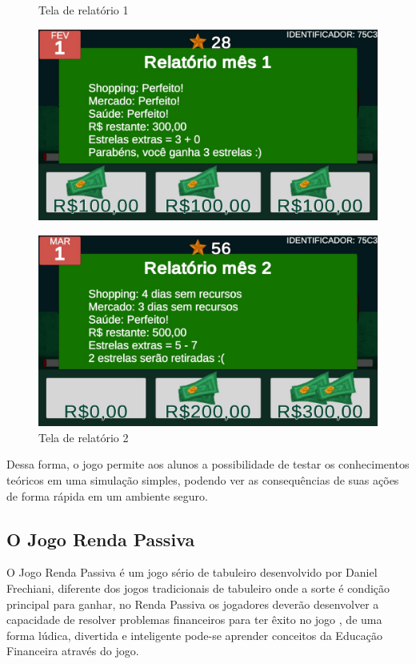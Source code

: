 \graphicspath{{figuras/}}
\begin{figure}[!ht]
\center
\begin{minipage}{0.4\linewidth}
\center
\caption{Tela de relatório 1} \label{fig: figura05}
\includegraphics[width=1.0\linewidth]{05-figura_relatorio-mes-1}
\end{minipage}
\begin{minipage}{0.4\linewidth}
\center
\caption{Tela de relatório 2} \label{fig: figura06}
\includegraphics[width=1.0\linewidth]{06-figura_tela-relatorio-mes-2}
\end{minipage}
\end{figure}

Dessa forma, o jogo permite aos alunos a possibilidade de testar os conhecimentos teóricos em uma simulação simples, podendo ver as consequências de suas ações de forma rápida em um ambiente seguro.

\subsection{O Jogo Renda Passiva}
O Jogo Renda Passiva é um jogo sério de tabuleiro desenvolvido por Daniel Frechiani, diferente dos jogos tradicionais de tabuleiro onde a sorte é condição principal para ganhar, no Renda Passiva os jogadores deverão desenvolver a capacidade de resolver problemas financeiros para ter êxito no jogo \cite{frechiani2019a}, de uma forma lúdica, divertida e inteligente pode-se aprender conceitos da Educação Financeira através do jogo.

